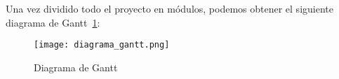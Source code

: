 Una vez dividido todo el proyecto en módulos, podemos obtener el siguiente diagrama de Gantt~\ref{fig:diag_gantt}:

\begin{figure}[h]
  \begin{center}
    \texttt{[image: diagrama\_gantt.png]}
  \end{center}
  \caption{Diagrama de Gantt}
  \label{fig:diag_gantt}
\end{figure}
